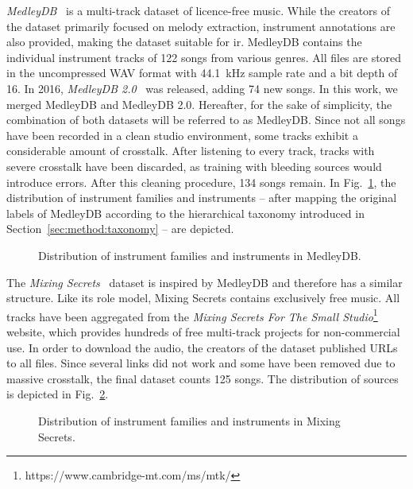 \textit{MedleyDB}~\cite{bittner2014medleydb} is a multi-track dataset of licence-free music. While the creators of the dataset primarily focused on melody extraction, instrument annotations are also provided, making the dataset suitable for \gls{ir}. MedleyDB contains the individual instrument tracks of 122 songs from various genres. All files are stored in the uncompressed WAV format with \SI{44.1}{\kilo\hertz} sample rate and a bit depth of 16. In 2016, \textit{MedleyDB 2.0}~\cite{bittner2016medleydb2} was released, adding 74 new songs. In this work, we merged MedleyDB and MedleyDB 2.0. Hereafter, for the sake of simplicity, the combination of both datasets will be referred to as MedleyDB. Since not all songs have been recorded in a clean studio environment, some tracks exhibit a considerable amount of crosstalk. After listening to every track, tracks with severe crosstalk have been discarded, as training with bleeding sources would introduce errors. After this cleaning procedure, 134 songs remain. In Fig.~\ref{fig:stats-medleydb}, the distribution of instrument families and instruments -- after mapping the original labels of MedleyDB according to the hierarchical taxonomy introduced in Section~\ref{sec:method:taxonomy} -- are depicted.\\
\begin{figure}
	\centering%
	\caption{Distribution of instrument families and instruments in MedleyDB.}\label{fig:stats-medleydb}
\end{figure}

The \textit{Mixing Secrets}~\cite{gururani2017mixingsecrets} dataset is inspired by MedleyDB and therefore has a similar structure. Like its role model, Mixing Secrets contains exclusively free music. All tracks have been aggregated from the \textit{Mixing Secrets For The Small Studio}\footnote{https://www.cambridge-mt.com/ms/mtk/} website, which provides hundreds of free multi-track projects for non-commercial use. In order to download the audio, the creators of the dataset published URLs to all files. Since several links did not work and some have been removed due to massive crosstalk, the final dataset counts 125 songs. The distribution of sources is depicted in Fig.~\ref{fig:stats-mixingsecrets}.\\
\begin{figure}
	\centering%
	\caption{Distribution of instrument families and instruments in Mixing Secrets.}\label{fig:stats-mixingsecrets}
\end{figure}


